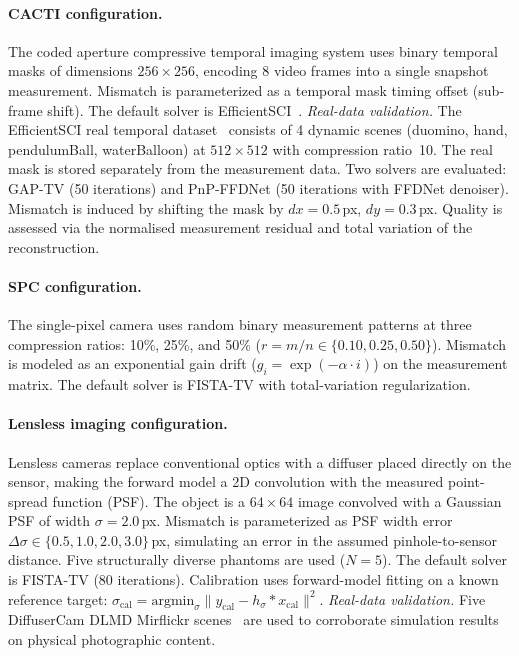 \documentclass[11pt]{article}
\begin{document}
\paragraph{CACTI configuration.}
The coded aperture compressive temporal imaging system uses binary
temporal masks of dimensions $256 \times 256$, encoding 8 video frames
into a single snapshot measurement.  Mismatch is parameterized as a
temporal mask timing offset (sub-frame shift).  The default solver is
EfficientSCI~\cite{wang2023efficientsci}.
\textit{Real-data validation.}
The EfficientSCI real temporal dataset~\cite{wang2023efficientsci} consists
of 4 dynamic scenes (duomino, hand, pendulumBall, waterBalloon) at
$512 \times 512$ with compression ratio~10.  The real mask is stored
separately from the measurement data.  Two solvers are evaluated:
GAP-TV (50 iterations) and PnP-FFDNet (50 iterations with FFDNet denoiser).
Mismatch is induced by shifting the mask by $dx = 0.5$\,px, $dy = 0.3$\,px.
Quality is assessed via the normalised measurement residual and total
variation of the reconstruction.

\paragraph{SPC configuration.}
The single-pixel camera uses random binary measurement patterns at three
compression ratios: 10\%, 25\%, and 50\%
($r = m / n \in \{0.10, 0.25, 0.50\}$).  Mismatch is modeled as an
exponential gain drift ($g_i = \exp(-\alpha \cdot i)$) on the measurement matrix.  The default solver
is FISTA-TV with total-variation regularization.

\paragraph{Lensless imaging configuration.}
Lensless cameras replace conventional optics with a diffuser placed directly
on the sensor, making the forward model a 2D convolution with the measured
point-spread function (PSF).  The object is a $64 \times 64$ image
convolved with a Gaussian PSF of width $\sigma = 2.0$\,px.  Mismatch is
parameterized as PSF width error
$\Delta\sigma \in \{0.5, 1.0, 2.0, 3.0\}$\,px, simulating an error in
the assumed pinhole-to-sensor distance.  Five structurally diverse phantoms
are used ($N{=}5$).  The default solver is FISTA-TV (80 iterations).
Calibration uses forward-model fitting on a known reference target:
$\sigma_{\mathrm{cal}} = \mathrm{argmin}_\sigma \|y_{\mathrm{cal}} -
h_\sigma * x_{\mathrm{cal}}\|^2$.
\textit{Real-data validation.}
Five DiffuserCam DLMD Mirflickr scenes~\cite{Antipa2018} are used to
corroborate simulation results on physical photographic content.
\end{document}
